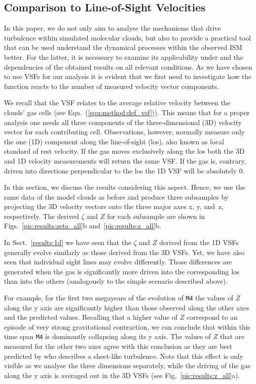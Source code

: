 \subsection{Comparison to Line-of-Sight Velocities}\label{discussion:1d}

In this paper, we do not only aim to analyse the mechanisms that drive turbulence within simulated molecular clouds, but also to provide a practical tool that can be used understand the dynamical processes within the observed ISM better.
For the latter, it is necessary to examine its applicability under and the dependencies of the obtained results on all relevant conditions. 
As we have chosen to use VSFs for our analysis it is evident that we first need to investigate how the function reacts to the number of measured velocity vector components. 

We recall that the VSF relates to the average relative velocity between the clouds' gas cells (see Equ.~(\ref{equ:method:def_vsf})).
This means that for a proper analysis one needs all three components of the three-dimensional (3D) velocity vector for each contributing cell.
Observations, however, normally measure only the one (1D) component along the line-of-sight (los), also known as local standard of rest velocity.
If the gas moves exclusively along the los both the 3D and 1D velocity measurements will return the same VSF. 
If the gas is, contrary, driven into directions perpendicular to the los the 1D VSF will be absolutely 0.
 
In this section, we discuss the results considering this aspect.
Hence, we use the same data of the model clouds as before and produce three subsamples by projecting the 3D velocity vectors onto the three major axes x, y, and~z, respectively.
The derived $\zeta$ and $Z$ for each subsample are shown in Figs.~\ref{pic:results:zeta_all}b and~\ref{pic:results:z_all}b.

In Sect.~\ref{results:1d} we have seen that the $\zeta$ and $Z$ derived from the 1D VSFs generally evolve similarly as those derived from the 3D VSFs.
Yet, we have also seen that individual sight lines may evolve differently.
Those differences are generated when the gas is significantly more driven into the corresponding los than into the others (analogously to the simple scenario described above). 

For example, for the first two megayears of the evolution of \texttt{M4} the values of $Z$ along the y axis are significantly higher than those observed along the other axes and the predicted values.
Recalling that a higher value of $Z$ correspond to an episode of very strong gravitational contraction, we can conclude that within this time span \texttt{M4} is dominantly collapsing along its y axis. 
The values of $Z$ that are measured for the other two axes agree with this conclusion as they are best predicted by \citet{Boldyrev2002} who describes a sheet-like turbulence. 
Note that this effect is only visible as we analyse the three dimensions separately, while the driving of the gas along the y axis is averaged out in the 3D VSFs (see Fig.~\ref{pic:results:z_all}a).


